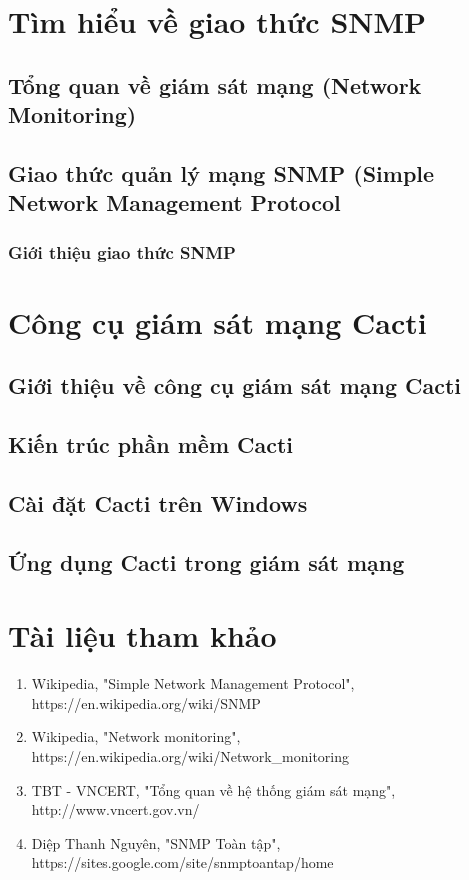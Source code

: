 \documentclass[12pt,oneside,a4paper]{article}
\theoremstyle{definition}
\begin{document}
\section{Tìm hiểu về giao thức SNMP}
\subsection{Tổng quan về giám sát mạng (Network Monitoring)}
\subsection{Giao thức quản lý mạng SNMP (Simple Network Management Protocol}
\subsubsection{Giới thiệu giao thức SNMP}

\section{Công cụ giám sát mạng Cacti}
\subsection{Giới thiệu về công cụ giám sát mạng Cacti}
\subsection{Kiến trúc phần mềm Cacti}
\subsection{Cài đặt Cacti trên Windows}
\subsection{Ứng dụng Cacti trong giám sát mạng}

\newpage
\section*{Tài liệu tham khảo}
%
%
\begin{enumerate}
\item{Wikipedia, "Simple Network Management Protocol", https://en.wikipedia.org/wiki/SNMP}
\item{Wikipedia, "Network monitoring", https://en.wikipedia.org/wiki/Network\_monitoring}
\item{TBT - VNCERT, "Tổng quan về hệ thống giám sát mạng", http://www.vncert.gov.vn/}
\item{Diệp Thanh Nguyên, "SNMP Toàn tập", https://sites.google.com/site/snmptoantap/home}
\end{enumerate}
	
\end{document}
